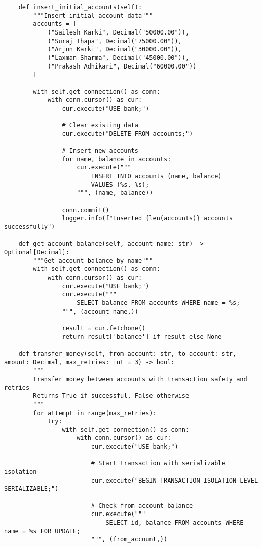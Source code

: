 \begin{verbatim}
    def insert_initial_accounts(self):
        """Insert initial account data"""
        accounts = [
            ("Sailesh Karki", Decimal("50000.00")),
            ("Suraj Thapa", Decimal("75000.00")),
            ("Arjun Karki", Decimal("30000.00")),
            ("Laxman Sharma", Decimal("45000.00")),
            ("Prakash Adhikari", Decimal("60000.00"))
        ]

        with self.get_connection() as conn:
            with conn.cursor() as cur:
                cur.execute("USE bank;")

                # Clear existing data
                cur.execute("DELETE FROM accounts;")

                # Insert new accounts
                for name, balance in accounts:
                    cur.execute("""
                        INSERT INTO accounts (name, balance)
                        VALUES (%s, %s);
                    """, (name, balance))

                conn.commit()
                logger.info(f"Inserted {len(accounts)} accounts successfully")

    def get_account_balance(self, account_name: str) -> Optional[Decimal]:
        """Get account balance by name"""
        with self.get_connection() as conn:
            with conn.cursor() as cur:
                cur.execute("USE bank;")
                cur.execute("""
                    SELECT balance FROM accounts WHERE name = %s;
                """, (account_name,))

                result = cur.fetchone()
                return result['balance'] if result else None

    def transfer_money(self, from_account: str, to_account: str, amount: Decimal, max_retries: int = 3) -> bool:
        """
        Transfer money between accounts with transaction safety and retries
        Returns True if successful, False otherwise
        """
        for attempt in range(max_retries):
            try:
                with self.get_connection() as conn:
                    with conn.cursor() as cur:
                        cur.execute("USE bank;")

                        # Start transaction with serializable isolation
                        cur.execute("BEGIN TRANSACTION ISOLATION LEVEL SERIALIZABLE;")

                        # Check from_account balance
                        cur.execute("""
                            SELECT id, balance FROM accounts WHERE name = %s FOR UPDATE;
                        """, (from_account,))


\end{verbatim}
